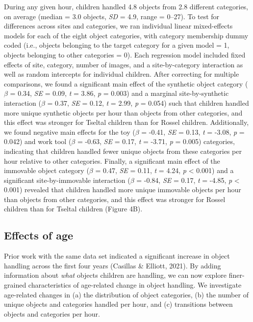 \documentclass[10pt, letterpaper]{article}
\begin{document}
During any given hour, children handled 4.8 objects from 2.8 different
categories, on average (median = 3.0 objects, \emph{SD} = 4.9, range =
0--27). To test for differences across sites and categories, we ran
individual linear mixed-effects models for each of the eight object
categories, with category membership dummy coded (i.e., objects
belonging to the target category for a given model = 1, objects
belonging to other categories = 0). Each regression model included fixed
effects of site, category, number of images, and a site-by-category
interaction as well as random intercepts for individual children. After
correcting for multiple comparisons, we found a significant main effect
of the synthetic object category (\(\beta\) = 0.34, \emph{SE} = 0.09,
\emph{t} = 3.86, \emph{p} = 0.003) and a marginal site-by-synthetic
interaction (\(\beta\) = 0.37, \emph{SE} = 0.12, \emph{t} = 2.99,
\emph{p} = 0.054) such that children handled more unique synthetic
objects per hour than objects from other categories, and this effect was
stronger for Tseltal children than for Rossel children. Additionally, we
found negative main effects for the toy (\(\beta\) = -0.41, \emph{SE} =
0.13, \emph{t} = -3.08, \emph{p} = 0.042) and work tool (\(\beta\) =
-0.63, \emph{SE} = 0.17, \emph{t} = -3.71, \emph{p} = 0.005) categories,
indicating that children handled fewer unique objects from these
categories per hour relative to other categories. Finally, a significant
main effect of the immovable object category (\(\beta\) = 0.47,
\emph{SE} = 0.11, \emph{t} = 4.24, \emph{p} \textless{} 0.001) and a
significant site-by-immovable interaction (\(\beta\) = -0.84, \emph{SE}
= 0.17, \emph{t} = -4.85, \emph{p} \textless{} 0.001) revealed that
children handled more unique immovable objects per hour than objects
from other categories, and this effect was stronger for Rossel children
than for Tseltal children (Figure 4B).

\hypertarget{effects-of-age}{%
\subsection{Effects of age}\label{effects-of-age}}

Prior work with the same data set indicated a significant increase in
object handling across the first four years (Casillas \& Elliott, 2021).
By adding information about \emph{what} objects children are handling,
we can now explore finer-grained characteristics of age-related change
in object handling. We investigate age-related changes in (a) the
distribution of object categories, (b) the number of unique objects and
categories handled per hour, and (c) transitions between objects and
categories per hour.
\end{document}
